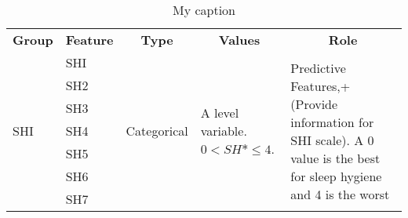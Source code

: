 \documentclass[10pt,letterpaper,oneside]{article}
\begin{document}
	\begin{table}[]
		\centering
		\caption{My caption}
		\label{my-label}
		\begin{tabular}{lllll}
			\multicolumn{1}{c}{\textbf{Group}} & \multicolumn{1}{c}{\textbf{Feature}} & \multicolumn{1}{c}{\textbf{Type}} & \multicolumn{1}{c}{\textbf{Values}}                    & \multicolumn{1}{c}{\textbf{Role}}                                                                                                       \\
			\multirow{21}{*}{SHI}              & SHI                                  & \multirow{21}{*}{Categorical}     & \multirow{21}{*}{A level variable. $ 0 < SH*\leq 4 $.} & \multirow{21}{*}{Predictive Features,+ (Provide information for SHI scale). A 0 value is the best for sleep hygiene and 4 is the worst} \\
			& SH2                                  &                                   &                                                        &                                                                                                                                         \\
			& SH3                                  &                                   &                                                        &                                                                                                                                         \\
			& SH4                                  &                                   &                                                        &                                                                                                                                         \\
			& SH5                                  &                                   &                                                        &                                                                                                                                         \\
			& SH6                                  &                                   &                                                        &                                                                                                                                         \\
			& SH7                                  &                                   &                                                        &                                                                                                                                         \\

\end{tabular}
\end{table}
\end{document}
